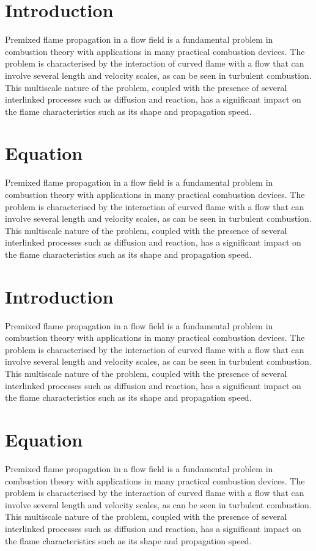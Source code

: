 \section{Introduction}
Premixed flame propagation in a flow field is a fundamental problem in combustion theory with applications in many practical combustion devices. The problem is characterised by the interaction of curved flame with a flow that can involve several length and velocity scales, as can be seen in turbulent combustion. This multiscale nature of the problem, coupled with the presence of several interlinked processes such as diffusion and reaction, has a significant impact on the flame characteristics such as its shape and propagation speed.

\section{Equation}
Premixed flame propagation in a flow field is a fundamental problem in combustion theory with applications in many practical combustion devices. The problem is characterised by the interaction of curved flame with a flow that can involve several length and velocity scales, as can be seen in turbulent combustion. This multiscale nature of the problem, coupled with the presence of several interlinked processes such as diffusion and reaction, has a significant impact on the flame characteristics such as its shape and propagation speed.
\section{Introduction}
Premixed flame propagation in a flow field is a fundamental problem in combustion theory with applications in many practical combustion devices. The problem is characterised by the interaction of curved flame with a flow that can involve several length and velocity scales, as can be seen in turbulent combustion. This multiscale nature of the problem, coupled with the presence of several interlinked processes such as diffusion and reaction, has a significant impact on the flame characteristics such as its shape and propagation speed.

\section{Equation}
Premixed flame propagation in a flow field is a fundamental problem in combustion theory with applications in many practical combustion devices. The problem is characterised by the interaction of curved flame with a flow that can involve several length and velocity scales, as can be seen in turbulent combustion. This multiscale nature of the problem, coupled with the presence of several interlinked processes such as diffusion and reaction, has a significant impact on the flame characteristics such as its shape and propagation speed. 

